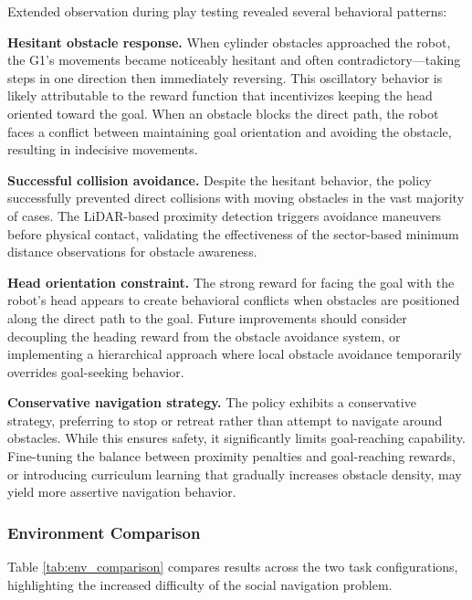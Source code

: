 \documentclass[12pt,a4paper]{article}
\begin{document}
Extended observation during play testing revealed several behavioral patterns:

\textbf{Hesitant obstacle response.} When cylinder obstacles approached the robot, the G1's movements became noticeably hesitant and often contradictory---taking steps in one direction then immediately reversing. This oscillatory behavior is likely attributable to the reward function that incentivizes keeping the head oriented toward the goal. When an obstacle blocks the direct path, the robot faces a conflict between maintaining goal orientation and avoiding the obstacle, resulting in indecisive movements.

\textbf{Successful collision avoidance.} Despite the hesitant behavior, the policy successfully prevented direct collisions with moving obstacles in the vast majority of cases. The LiDAR-based proximity detection triggers avoidance maneuvers before physical contact, validating the effectiveness of the sector-based minimum distance observations for obstacle awareness.

\textbf{Head orientation constraint.} The strong reward for facing the goal with the robot's head appears to create behavioral conflicts when obstacles are positioned along the direct path to the goal. Future improvements should consider decoupling the heading reward from the obstacle avoidance system, or implementing a hierarchical approach where local obstacle avoidance temporarily overrides goal-seeking behavior.

\textbf{Conservative navigation strategy.} The policy exhibits a conservative strategy, preferring to stop or retreat rather than attempt to navigate around obstacles. While this ensures safety, it significantly limits goal-reaching capability. Fine-tuning the balance between proximity penalties and goal-reaching rewards, or introducing curriculum learning that gradually increases obstacle density, may yield more assertive navigation behavior.

\subsubsection{Environment Comparison}

Table \ref{tab:env_comparison} compares results across the two task configurations, highlighting the increased difficulty of the social navigation problem.
\end{document}
